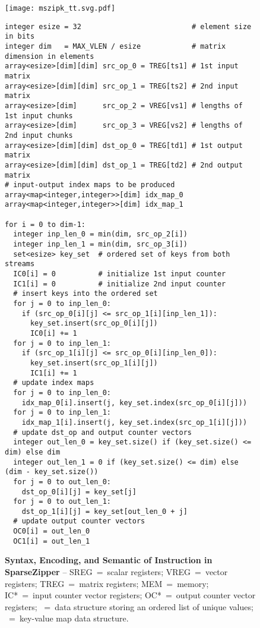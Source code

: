 \lstset{style=python-style}

\begin{figure*}[tp]
\centering


\texttt{[image: mszipk\_tt.svg.pdf]}
\begin{lstlisting}[xleftmargin=0.025\tw]
integer esize = 32                          # element size in bits
integer dim   = MAX_VLEN / esize            # matrix dimension in elements
array<esize>[dim][dim] src_op_0 = TREG[ts1] # 1st input matrix
array<esize>[dim][dim] src_op_1 = TREG[ts2] # 2nd input matrix
array<esize>[dim]      src_op_2 = VREG[vs1] # lengths of 1st input chunks
array<esize>[dim]      src_op_3 = VREG[vs2] # lengths of 2nd input chunks
array<esize>[dim][dim] dst_op_0 = TREG[td1] # 1st output matrix
array<esize>[dim][dim] dst_op_1 = TREG[td2] # 2nd output matrix
# input-output index maps to be produced
array<map<integer,integer>>[dim] idx_map_0
array<map<integer,integer>>[dim] idx_map_1

for i = 0 to dim-1:
  integer inp_len_0 = min(dim, src_op_2[i])
  integer inp_len_1 = min(dim, src_op_3[i])
  set<esize> key_set  # ordered set of keys from both streams
  IC0[i] = 0          # initialize 1st input counter
  IC1[i] = 0          # initialize 2nd input counter
  # insert keys into the ordered set
  for j = 0 to inp_len_0:
    if (src_op_0[i][j] <= src_op_1[i][inp_len_1]):
      key_set.insert(src_op_0[i][j])
      IC0[i] += 1
  for j = 0 to inp_len_1:
    if (src_op_1[i][j] <= src_op_0[i][inp_len_0]):
      key_set.insert(src_op_1[i][j])
      IC1[i] += 1
  # update index maps
  for j = 0 to inp_len_0:
    idx_map_0[i].insert(j, key_set.index(src_op_0[i][j]))
  for j = 0 to inp_len_1:
    idx_map_1[i].insert(j, key_set.index(src_op_1[i][j]))
  # update dst_op and output counter vectors
  integer out_len_0 = key_set.size() if (key_set.size() <= dim) else dim
  integer out_len_1 = 0 if (key_set.size() <= dim) else (dim - key_set.size())
  for j = 0 to out_len_0:
    dst_op_0[i][j] = key_set[j]
  for j = 0 to out_len_1:
    dst_op_1[i][j] = key_set[out_len_0 + j]
  # update output counter vectors
  OC0[i] = out_len_0
  OC1[i] = out_len_1
\end{lstlisting}

\caption[Stream Key Zipping Instruction in SparseZipper]{
  \textbf{Syntax, Encoding, and Semantic of  Instruction in SparseZipper} --
  SREG~=~scalar registers;
  VREG~=~vector registers;
  TREG~=~matrix registers;
  MEM~=~memory;
  IC*~=~input counter vector registers;
  OC*~=~output counter vector registers;
  ~=~data structure storing an ordered list of unique values;
  ~=~key-value map data structure.
}
\label{fig:spz-mszipk-inst}
\end{figure*}
